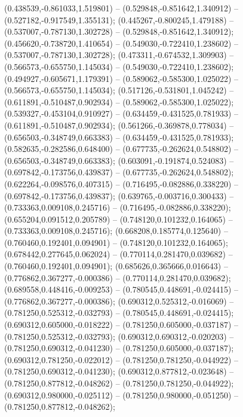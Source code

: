  (0.438539,-0.861033,1.519801) -- (0.529848,-0.851642,1.340912) -- (0.527182,-0.917549,1.355131);
 (0.445267,-0.800245,1.479188) -- (0.537007,-0.787130,1.302728) -- (0.529848,-0.851642,1.340912);
 (0.456620,-0.738720,1.410654) -- (0.549030,-0.722410,1.238602) -- (0.537007,-0.787130,1.302728);
 (0.473311,-0.674532,1.309903) -- (0.566573,-0.655750,1.145034) -- (0.549030,-0.722410,1.238602);
 (0.494927,-0.605671,1.179391) -- (0.589062,-0.585300,1.025022) -- (0.566573,-0.655750,1.145034);
 (0.517126,-0.531801,1.045242) -- (0.611891,-0.510487,0.902934) -- (0.589062,-0.585300,1.025022);
 (0.539327,-0.453104,0.910927) -- (0.634459,-0.431525,0.781933) -- (0.611891,-0.510487,0.902934);
 (0.561266,-0.369878,0.778034) -- (0.656503,-0.348749,0.663383) -- (0.634459,-0.431525,0.781933);
 (0.582635,-0.282586,0.648400) -- (0.677735,-0.262624,0.548802) -- (0.656503,-0.348749,0.663383);
 (0.603091,-0.191874,0.524083) -- (0.697842,-0.173756,0.439837) -- (0.677735,-0.262624,0.548802);
 (0.622264,-0.098576,0.407315) -- (0.716495,-0.082886,0.338220) -- (0.697842,-0.173756,0.439837);
 (0.639765,-0.003716,0.300433) -- (0.733363,0.009108,0.245716) -- (0.716495,-0.082886,0.338220);
 (0.655204,0.091512,0.205789) -- (0.748120,0.101232,0.164065) -- (0.733363,0.009108,0.245716);
 (0.668208,0.185774,0.125640) -- (0.760460,0.192401,0.094901) -- (0.748120,0.101232,0.164065);
 (0.678442,0.277645,0.062024) -- (0.770114,0.281470,0.039682) -- (0.760460,0.192401,0.094901);
 (0.685626,0.365666,0.016643) -- (0.776862,0.367277,-0.000386) -- (0.770114,0.281470,0.039682);
 (0.689558,0.448416,-0.009253) -- (0.780545,0.448691,-0.024415) -- (0.776862,0.367277,-0.000386);
 (0.690312,0.525312,-0.016069) -- (0.781250,0.525312,-0.032793) -- (0.780545,0.448691,-0.024415);
 (0.690312,0.605000,-0.018222) -- (0.781250,0.605000,-0.037187) -- (0.781250,0.525312,-0.032793);
 (0.690312,0.690312,-0.020203) -- (0.781250,0.690312,-0.041230) -- (0.781250,0.605000,-0.037187);
 (0.690312,0.781250,-0.022012) -- (0.781250,0.781250,-0.044922) -- (0.781250,0.690312,-0.041230);
 (0.690312,0.877812,-0.023648) -- (0.781250,0.877812,-0.048262) -- (0.781250,0.781250,-0.044922);
 (0.690312,0.980000,-0.025112) -- (0.781250,0.980000,-0.051250) -- (0.781250,0.877812,-0.048262);

